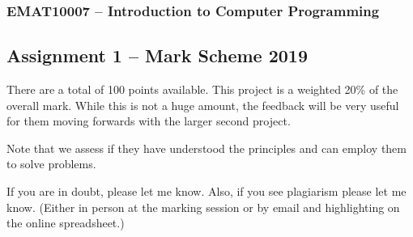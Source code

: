 \documentclass[11pt]{report}
\begin{document}
\subsubsection*{EMAT10007 -- Introduction to Computer Programming}
\subsection*{\Large Assignment 1 -- Mark Scheme 2019}

There are a total of 100 points available. This project is a weighted 20\% of the overall mark. While this is not a huge amount, the feedback will be very useful for them moving forwards with the larger second project.

\medskip

Note that we assess if they have understood the principles and can employ them to solve problems. 

\medskip

If you are in doubt, please let me know. Also, if you see plagiarism please let me know. (Either in person at the marking session or by email and highlighting on the online spreadsheet.)


\begin{Exercise}[title=Basic Implementation (15 marks)]
\end{Exercise}
\end{document}
